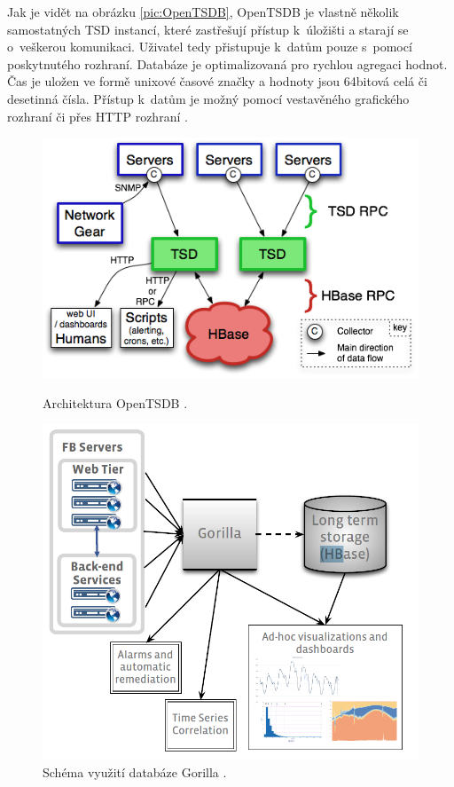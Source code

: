 Jak je vidět na obrázku \ref{pic:OpenTSDB}, OpenTSDB je vlastně několik samostatných TSD instancí, které zastřešují přístup k~úložišti a starají se o~veškerou komunikaci. Uživatel tedy přistupuje k~datům pouze s~pomocí poskytnutého rozhraní. Databáze je optimalizovaná pro rychlou agregaci hodnot. Čas je uložen ve formě unixové časové značky a hodnoty jsou 64bitová celá či desetinná čísla. Přístup k~datům je možný pomocí vestavěného grafického rozhraní či přes HTTP rozhraní \cite{TSDBdoku}.

\begin{figure}[!tbp]
  \centering
  \begin{minipage}[b]{0.45\textwidth}
    \includegraphics[width=\textwidth]{obrazky-figures/tsdb-architecture.png}
    \caption{Architektura OpenTSDB \cite{TSDBdoku}.}
    \label{pic:OpenTSDB}
  \end{minipage}
  \hfill
  \begin{minipage}[b]{0.45\textwidth}
    \includegraphics[width=\textwidth]{obrazky-figures/gorilla.PNG}
    \caption{Schéma využití databáze Gorilla \cite{gorilla}.}
    \label{pic:gorilla}
  \end{minipage}
\end{figure}

